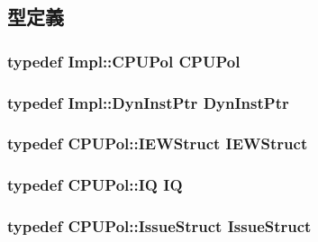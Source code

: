 \subsection{型定義}
\hypertarget{classDefaultIEW_a87d662eaeb9eab249d671b63cb4ba11a}{
\subsubsection[{CPUPol}]{\setlength{\rightskip}{0pt plus 5cm}typedef Impl::CPUPol {\bf CPUPol}}}
\label{classDefaultIEW_a87d662eaeb9eab249d671b63cb4ba11a}
\hypertarget{classDefaultIEW_a028ce10889c5f6450239d9e9a7347976}{
\subsubsection[{DynInstPtr}]{\setlength{\rightskip}{0pt plus 5cm}typedef Impl::DynInstPtr {\bf DynInstPtr}}}
\label{classDefaultIEW_a028ce10889c5f6450239d9e9a7347976}
\hypertarget{classDefaultIEW_a7cf3f052f760b3a8a18623f792c10910}{
\subsubsection[{IEWStruct}]{\setlength{\rightskip}{0pt plus 5cm}typedef CPUPol::IEWStruct {\bf IEWStruct}}}
\label{classDefaultIEW_a7cf3f052f760b3a8a18623f792c10910}
\hypertarget{classDefaultIEW_aaecfbaa9bf5c22b455806f40f49ef627}{
\subsubsection[{IQ}]{\setlength{\rightskip}{0pt plus 5cm}typedef CPUPol::IQ {\bf IQ}}}
\label{classDefaultIEW_aaecfbaa9bf5c22b455806f40f49ef627}
\hypertarget{classDefaultIEW_aea279208ef417c3e47681ba0d183bd04}{
\subsubsection[{IssueStruct}]{\setlength{\rightskip}{0pt plus 5cm}typedef CPUPol::IssueStruct {\bf IssueStruct}}}
